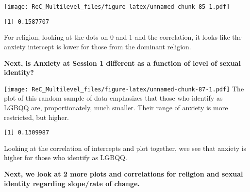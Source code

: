 \documentclass[
  11pt,
]{book}
\newenvironment{Shaded}{\begin{snugshade}}{\end{snugshade}}
\newcommand{\AttributeTok}[1]{\textcolor[rgb]{0.77,0.63,0.00}{#1}}
\newcommand{\FunctionTok}[1]{\textcolor[rgb]{0.00,0.00,0.00}{#1}}
\newcommand{\NormalTok}[1]{#1}
\newcommand{\SpecialCharTok}[1]{\textcolor[rgb]{0.00,0.00,0.00}{#1}}
\newcommand{\StringTok}[1]{\textcolor[rgb]{0.31,0.60,0.02}{#1}}
\begin{document}
\texttt{[image: ReC\_Multilevel\_files/figure-latex/unnamed-chunk-85-1.pdf]}

\begin{Shaded}
\end{Shaded}

\begin{verbatim}
[1] 0.1587707
\end{verbatim}

For religion, looking at the dots on 0 and 1 and the correlation, it looks like the anxiety intercept is lower for those from the dominant religion.

\textbf{Next, is Anxiety at Session 1 different as a function of level of sexual identity?}

\begin{Shaded}
\end{Shaded}

\texttt{[image: ReC\_Multilevel\_files/figure-latex/unnamed-chunk-87-1.pdf]}
The plot of this random sample of data emphasizes that those who identify as LGBQQ are, proportionately, much smaller. Their range of anxiety is more restricted, but higher.

\begin{Shaded}
\end{Shaded}

\begin{verbatim}
[1] 0.1309987
\end{verbatim}

Looking at the correlation of intercepts and plot together, wee see that anxiety is higher for those who identify as LGBQQ.

\textbf{Next, we look at 2 more plots and correlations for religion and sexual identity regarding slope/rate of change.}

\begin{Shaded}
\end{Shaded}
\end{document}
